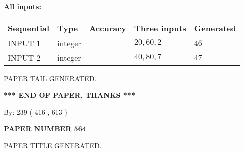 \documentclass[12pt]{article}
\begin{document}
   
   
   
\noindent\vspace{0.1in}\hspace{-0.08in} {\textbf{\Large{All inputs: }}}
   
   
  
  
\noindent\begin{tabular}{|l|l|l|l|l|}
\hline
 Sequential & Type & Accuracy & Three inputs & Generated \\ 
\hline
 
 
  INPUT $  1 $ & integer &  & $
 20
 , 
 60
 , 
 2
 $ & $ 46 $ 
 \\  \hline  
 
 
  INPUT $  2 $ & integer &  & $
 40
 , 
 80
 , 
 7
 $ & $ 47 $ 
 \\  \hline  
 \end{tabular}
   
   
   
   
   
   
 \vspace{0.2in}
 
   
   
\vspace{2.0in} PAPER TAIL GENERATED.
   
   
   
   
\vspace{1.0in} 
{\textbf{\large{ *** END OF PAPER, THANKS *** }}} 
   
   
\hspace{1.0in} By: 
 239 ( 416 ,  613 )
   
   
   
   
\newpage 
\setcounter{page}{ 
   564001 } 
   
   
   
   
 {\textbf{ \Large{ PAPER NUMBER  564  }}}
   
   
\vspace{0.2in}
   
   
   
   
   
   
   
   
 \vspace{0.2in}
 
 
 
 
   
   
 PAPER TITLE GENERATED.
   
   
   
\vspace{0.2in}
   
\end{document}
